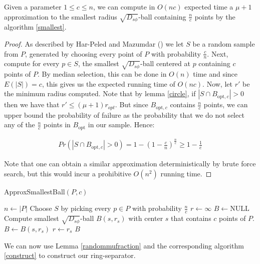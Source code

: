 \documentclass[11pt]{myclass}
\newcommand{\sbreg}{\ensuremath{D_{s\phi}}}
\begin{document}
\begin{lemma} \label{randommufraction}
 Given a parameter $1 \leq c \leq n$, we can compute in $O(nc)$ expected time a $\mu+1$ approximation to the smallest  
radius $\sqrt{\sbreg}$-ball containing $\frac{n}{c}$ points by the algorithm \ref{smallest}. 
\end{lemma}
\begin{proof}
As described by Har-Peled and Mazumdar (\cite{smallestdisk}) we let $S$ be a random sample from $P$, generated by choosing every point of $P$ with probability $\frac{c}{n}$. Next, compute for every $p \in S$, the
smallest $\sqrt{\sbreg}$-ball centered at $p$ containing $c$ points of $P$. By median selection, this can be done in $O(n)$ time and since $E(|S|) = c$, this gives us
the expected running time of $O(nc)$. Now, let $r'$ be the minimum radius computed.
Note that by lemma \ref{circle}, if $|S \cap B_{\text{opt},c} | > 0$ then we have that $r' \leq (\mu+1) r_{opt}$.
 But since $B_{\text{opt},c}$ contains $\frac{n}{c}$ points, we can upper bound the probability of
 failure as the probability that we do not select any of the $\frac{n}{c}$ points in $B_{\text{opt}}$ in our
sample. Hence:

\begin{align*}
Pr(|S \cap B_{\text{opt},c}| > 0) = 1 - \left(1 - \frac{c}{n} \right)^{\frac{n}{c}} \geq 1 - \frac{1}{e}
\end{align*}

Note that one can obtain a similar approximation deterministically by brute force search, but this would incur a prohibitive
$O(n^2)$ running time.
\end{proof}

\begin{algorithm}
  \caption{ApproxSmallestBall$(P,c)$}
  \begin{algorithmic}
  	\STATE  $n \gets |P|$
    \STATE Choose $S$ by picking every $p \in P$ with probability $\frac{n}{c}$
    \STATE  $r \gets \infty$
    \STATE $B \gets \text{NULL}$
    	\STATE Compute smallest $\sqrt{\sbreg}$-ball $B(s,r_s)$ with center $s$ that contains $c$ points of $P$.
    	  \STATE $B \gets B(s,r_s)$
    	  \STATE $r \gets r_s$
    	\ENDIF 
    \ENDFOR 
    \RETURN $B$
  \end{algorithmic}
  \label{smallest}
\end{algorithm}

We can now use Lemma \ref{randommufraction} and the corresponding algorithm \ref{construct} to construct our ring-separator.
\end{document}
